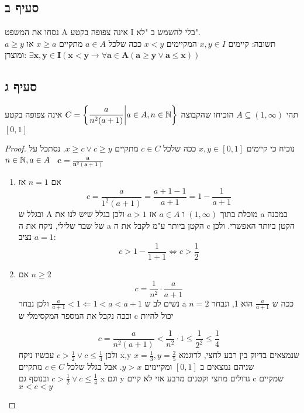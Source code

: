 \documentclass{article}
\begin{document}
 	\subsection*{סעיף ב}
 	נסחו את המשפט A אינה צפופה בקטע I בלי להשמש ב "לא". \\
 	תשובה:
 	קיימים $x,y \in I$ המקיימים $x < y$ ככה שלכל $a \in A$ מתקיים $x \geq a$ או $a \geq y$
 	ומוצרן:
 	$\bm{\exists x,y \in I(x< y \rightarrow \forall a \in A (a \geq y \lor a \leq x))}$

 	\subsection*{סעיף ג}
 	תהי $A \subseteq (1, \infty)$ הוכיחו שהקבוצה
 	$C = \bigg\{ \dfrac{a}{n^2(a+1)} \bigg| a \in A, n \in \mathbb{N} \bigg\}$
 	אינה צפופה בקטע $[0,1]$
 	\begin{proof}
 		נוכיח כי קיימים $x, y \in [0,1]$ ככה שלכל $c \in C$ מתקיים $x \geq c \lor c \geq y$.
 		נסתכל על
 		$n \in \mathbb{N}, a \in A$  \ $\bm{c = \frac{a}{n^2(a+1)}}$
 		\begin{enumerate}[I]
			\item אם $n = 1$ אז
			\[
				c = \frac{a}{1^2(a+1)}
				  = \frac{a + 1 - 1}{a + 1}
				  = 1 - \frac{1}{a+1}
			\]
			ובגלל ש A מוכלת בתוך $(1, \infty)$ ו $a \in A$ אז $a > 1$ ולכן בגלל שיש לנו את a במכנה של שבר שלילי, ניקח את ה a הקטן ביותר ע"מ לקבל את ה c הקטן ביותר האפשרי. ולכן נציב $a = 1$:
			\[ c > 1 - \frac{1}{1+1} \iff c > \frac{1}{2} \]

			\item  אם $n \geq 2$
			\[ c = \frac{1}{n^2} \cdot \frac{a}{a+1} \]
			נשים לב ש
			$\frac{a}{a+1} < 1 \Leftarrow 1 < a < a + 1$
			ולכן נבחר a ככה ש $\frac{a}{a+1}$ הוא 1, ונבחר $n = 2$ וככה נקבל את המספר המקסימלי ש c יכול להיות

			\[ c = \frac{a}{n^2(a+1)} < \frac{1}{n^2} \cdot 1 \leq \frac{1}{2^2} \leq \frac{1}{4} \]
			ולכן
			$c > \frac{1}{2} \lor c \leq \frac{1}{4}$
			עכשיו ניקח x,y שנמצאים בדיוק בין רבע לחצי, לדוגמא
			$x = \frac{1}{3}, y = \frac{2}{5}$
			שניהם נמצאים ב $[0,1]$ ומקיימים $y > x$. אבל בגלל שלכל $c \in C$ מתקיים
			 $c > \frac{1}{2} \lor c \leq \frac{1}{4}$ ובנוסף גם x וגם y גדולים מחצי וקטנים מרבע אזי לא קיים c שמקיים $x < c < y$
		\end{enumerate}
 	\end{proof}
\end{document}
